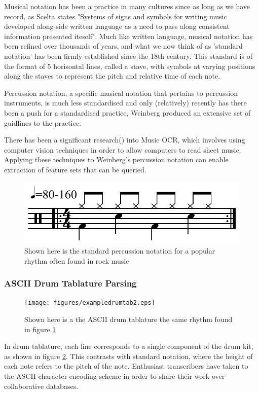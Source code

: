 \documentclass[12pt,twoside,notitlepage]{report}
\begin{document}
		Musical notation has been a practice in many cultures since as long as we have record, as Scelta states\cite{Scelta} "Systems of signs and symbols for writing music developed along-side written language as a need to pass along consistent information presented iteself". Much like written language, musical notation has been refined over thousands of years, and what we now think of as 'standard notation' has been firmly established since the 18th century\cite{Scelta}. This standard is of the format of 5 horisontal lines, called a stave, with symbols at varying positions along the staves to represent the pitch and relative time of each note.
		
		Percussion notation, a specific musical notation that pertains to percussion instruments, is much less standardised and only (relatively) recently has there been a push for a standardised practice, Weinberg produced an extensive set of guidlines to the practice\cite{Weinberg1994}.
		
		There has been a significant research(\cite{Johansen2009}\cite{BainbridgeBell2001}) into Music OCR\footnotemark {}, which involves using computer vision techniques in order to allow computers to read sheet music. Applying these techniques to Weinberg's percussion notation can enable extraction of feature sets that can be queried.
		\begin{figure}[h]
			\centerline{\includegraphics[scale=0.5]{figures/Characteristic_rock_drum_pattern.png}}
			\caption{\label{PercussionNotation} Shown here is the standard percussion notation for a popular rhythm often found in rock music}
\end{figure}
			\subsubsection{ASCII Drum Tablature Parsing}
						\begin{figure}[h]
			\centerline{\texttt{[image: figures/exampledrumtab2.eps]}}
			\caption{\label{DrumTablature} Shown here is a the ASCII drum tablature the same rhythm found in figure \ref{PercussionNotation}}
\end{figure}
				In drum tablature, each line corresponds to a single component of the drum kit, as shown in figure \ref{DrumTablature}. This contrasts with standard notation, where the height of each note refers to the pitch of the note. Enthusiast transcribers have taken to the ASCII character-encoding scheme in order to share their work over collaborative databases\footnotemark {}.
				
\end{document}
